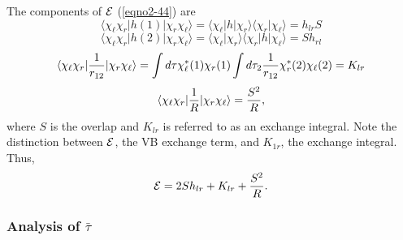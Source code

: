 The components of ${\cal E}$ (\ref{eqno2-44}) are
\begin{equation}
\langle \chi_\ell \chi_r \vert h ( 1 ) \vert \chi_r \chi_\ell \rangle = 
\langle \chi_\ell \vert h \vert \chi_r \rangle \langle \chi_r \vert 
\chi_\ell \rangle = h_{lr}S
\end{equation}
\begin{equation}
\langle \chi_\ell \chi_r \vert h (2) \vert \chi_r \chi_\ell \rangle = \langle 
\chi_\ell \vert \chi_r \rangle \langle \chi_r \vert h \vert \chi_\ell 
\rangle = S h_{rl}
\end{equation}
\begin{equation}
\langle \chi_\ell \chi_r \vert {1 \over r_{12}} \vert \chi_r \chi_\ell
\rangle = \int d \tau \chi^*_\ell (1)\chi_r(1) \int d \tau_2 {1 \over
r_{12}} \chi^*_r (2) \chi_\ell (2) = K_{lr}
\end{equation}
\begin{equation}
\langle \chi_\ell \chi_r \vert {1 \over R} \vert \chi_r \chi_\ell
\rangle = {S^2 \over R} ,
\end{equation}
where $S$ is the overlap and $K_{lr}$ is referred to as an exchange 
integral. Note the distinction between ${\cal E}$, the VB
exchange term, and $K_{1r}$, the exchange integral. Thus,
\begin{equation}
{\cal E} = 2 S h_{lr} + K_{lr} + {S^2 \over R} .
\end{equation}

\subsubsection{Analysis of ${\bar{\tau}}$}

